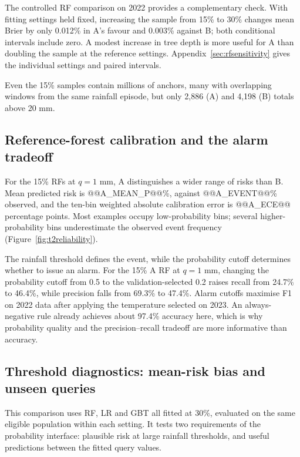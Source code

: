 The controlled RF comparison on 2022 provides a complementary check. With fitting settings held fixed, increasing the sample from 15\% to 30\% changes mean Brier by only 0.012\% in A's favour and 0.003\% against B; both conditional intervals include zero. A modest increase in tree depth is more useful for A than doubling the sample at the reference settings. Appendix~\ref{sec:rfsensitivity} gives the individual settings and paired intervals.

Even the 15\% samples contain millions of anchors, many with overlapping windows from the same rainfall episode, but only 2,886 (A) and 4,198 (B) totals above 20 mm.

\FloatBarrier
\subsection{Reference-forest calibration and the alarm tradeoff}
For the 15\% RFs at $q=1$ mm, A distinguishes a wider range of risks than B. Mean predicted risk is @@A_MEAN_P@@\%, against @@A_EVENT@@\% observed, and the ten-bin weighted absolute calibration error is @@A_ECE@@ percentage points. Most examples occupy low-probability bins; several higher-probability bins underestimate the observed event frequency (Figure~\ref{fig:t2reliability}).

The rainfall threshold defines the event, while the probability cutoff determines whether to issue an alarm. For the 15\% A RF at $q=1$ mm, changing the probability cutoff from 0.5 to the validation-selected 0.2 raises recall from 24.7\% to 46.4\%, while precision falls from 69.3\% to 47.4\%. Alarm cutoffs maximise F1 on 2022 data after applying the temperature selected on 2023. An always-negative rule already achieves about 97.4\% accuracy here, which is why probability quality and the precision--recall tradeoff are more informative than accuracy.

\FloatBarrier
\subsection{Threshold diagnostics: mean-risk bias and unseen queries}
This comparison uses RF, LR and GBT all fitted at 30\%, evaluated on the same eligible population within each setting. It tests two requirements of the probability interface: plausible risk at large rainfall thresholds, and useful predictions between the fitted query values.

